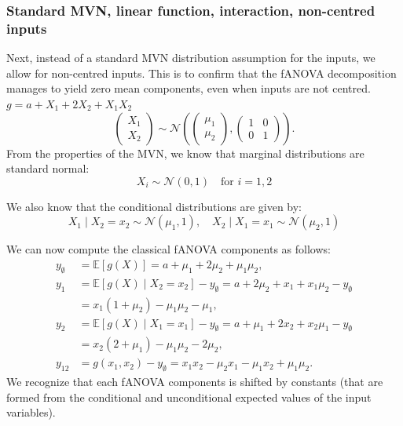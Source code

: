 \subsubsection*{Standard MVN, linear function, interaction, non-centred inputs}
Next, instead of a standard MVN distribution assumption for the inputs, we allow for non-centred inputs. This is to confirm that the fANOVA decomposition manages to yield zero mean components, even when inputs are not centred.
\(g = a + X_1 + 2X_2 + X_1 X_2\)
\[
\begin{pmatrix}
X_1 \\
X_2
\end{pmatrix}
\sim \mathcal{N}\left(
\begin{pmatrix} \mu_1 \\ \mu_2 \end{pmatrix},
\begin{pmatrix}
1 & 0 \\
0 & 1
\end{pmatrix}
\right).
\]
From the properties of the MVN, we know that marginal distributions are standard normal:
\[
X_i \sim \mathcal{N}(0, 1) \quad \text{for } i = 1, 2
\]

We also know that the conditional distributions are given by:
\[
X_1 \mid X_2 = x_2 \sim \mathcal{N}(\mu_1, 1), \quad
X_2 \mid X_1 = x_1 \sim \mathcal{N}(\mu_2, 1)
\]

We can now compute the classical fANOVA components as follows:
\begin{align*}
    y_{\emptyset} &= \mathbb{E}[g(X)] = a + \mu_1 + 2\mu_2 + \mu_1 \mu_2, \\
    y_1 &= \mathbb{E}[g(X) \mid X_2 = x_2] - y_{\emptyset}= a + 2\mu_2 + x_1 + x_1 \mu_2 - y_{\emptyset} \\
    &= x_1 ( 1 + \mu_2) - \mu_1 \mu_2 - \mu_1, \\
    y_2 &= \mathbb{E}[g(X) \mid X_1 = x_1] - y_{\emptyset} = a + \mu_1 + 2x_2 + x_2 \mu_1 - y_{\emptyset} \\
    &= x_2 (2 + \mu_1) - \mu_1 \mu_2 - 2 \mu_2, \\
    y_{12} &= g(x_1, x_2) - y_{\emptyset} = x_1x_2 - \mu_2 x_1 - \mu_1 x_2 + \mu_1 \mu_2.      
\end{align*}
We recognize that each fANOVA components is shifted by constants (that are formed from the conditional and unconditional expected values of the input variables). 

